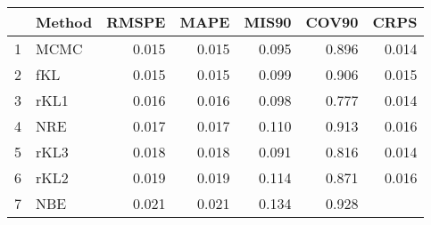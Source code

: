 \documentclass[12pt]{article}
\begin{document}
\thispagestyle{empty}
\begin{table}[ht]
\centering
\begin{tabular}{rlrrrrr}
  \hline
 & Method & RMSPE & MAPE & MIS90 & COV90 & CRPS \\ 
  \hline
1 & MCMC & 0.015 & 0.015 & 0.095 & 0.896 & 0.014 \\ 
  2 & fKL & 0.015 & 0.015 & 0.099 & 0.906 & 0.015 \\ 
  3 & rKL1 & 0.016 & 0.016 & 0.098 & 0.777 & 0.014 \\ 
  4 & NRE & 0.017 & 0.017 & 0.110 & 0.913 & 0.016 \\ 
  5 & rKL3 & 0.018 & 0.018 & 0.091 & 0.816 & 0.014 \\ 
  6 & rKL2 & 0.019 & 0.019 & 0.114 & 0.871 & 0.016 \\ 
  7 & NBE & 0.021 & 0.021 & 0.134 & 0.928 &  \\ 
   \hline
\end{tabular}
\end{table}
\end{document}
